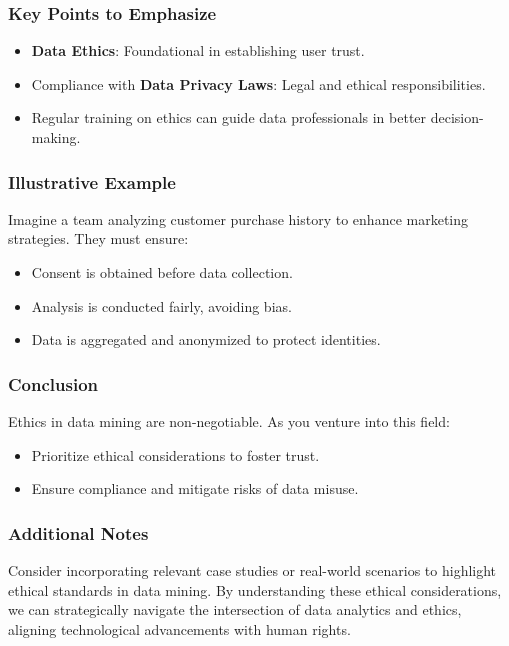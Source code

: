\documentclass[aspectratio=169]{beamer}
\begin{document}
\begin{frame}[fragile]
    \frametitle{Key Points to Emphasize}
    \begin{itemize}
        \item \textbf{Data Ethics}: Foundational in establishing user trust.
        \item Compliance with \textbf{Data Privacy Laws}: Legal and ethical responsibilities.
        \item Regular training on ethics can guide data professionals in better decision-making.
    \end{itemize}
\end{frame}

\begin{frame}[fragile]
    \frametitle{Illustrative Example}
    Imagine a team analyzing customer purchase history to enhance marketing strategies. They must ensure:
    \begin{itemize}
        \item Consent is obtained before data collection.
        \item Analysis is conducted fairly, avoiding bias.
        \item Data is aggregated and anonymized to protect identities.
    \end{itemize}
\end{frame}

\begin{frame}[fragile]
    \frametitle{Conclusion}
    Ethics in data mining are non-negotiable. As you venture into this field:
    \begin{itemize}
        \item Prioritize ethical considerations to foster trust.
        \item Ensure compliance and mitigate risks of data misuse.
    \end{itemize}
\end{frame}

\begin{frame}[fragile]
    \frametitle{Additional Notes}
    Consider incorporating relevant case studies or real-world scenarios to highlight ethical standards in data mining.
    By understanding these ethical considerations, we can strategically navigate the intersection of data analytics and ethics, aligning technological advancements with human rights.
\end{frame}
\end{document}
